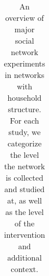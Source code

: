 \begin{table}
\begin{tabular}{|p{1.2in}|p{.9in}|p{1in}|p{2.2in}|p{4in}|}
\end{tabular}
\caption{An overview of major social network experiments in networks with household structure. For each study, we categorize the level the network is collected and studied at, as well as the level of the intervention and additional context.}\label{tab:review}
\vspace{-1.5in}
\end{table}
